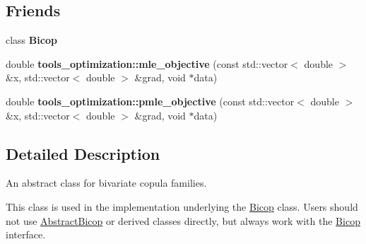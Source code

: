 \subsection*{Friends}
\begin{DoxyCompactItemize}
\item 
\hypertarget{classvinecopulib_1_1_abstract_bicop_af3db9e73153fd7fa7bb69657e7cb949d}{class {\bfseries Bicop}}\label{classvinecopulib_1_1_abstract_bicop_af3db9e73153fd7fa7bb69657e7cb949d}

\item 
\hypertarget{classvinecopulib_1_1_abstract_bicop_ac0e8ae7fffff069ed9476a97d8bfac19}{double {\bfseries tools\+\_\+optimization\+::mle\+\_\+objective} (const std\+::vector$<$ double $>$ \&x, std\+::vector$<$ double $>$ \&grad, void $\ast$data)}\label{classvinecopulib_1_1_abstract_bicop_ac0e8ae7fffff069ed9476a97d8bfac19}

\item 
\hypertarget{classvinecopulib_1_1_abstract_bicop_ae671e9f66df15a190329d53c802f70ef}{double {\bfseries tools\+\_\+optimization\+::pmle\+\_\+objective} (const std\+::vector$<$ double $>$ \&x, std\+::vector$<$ double $>$ \&grad, void $\ast$data)}\label{classvinecopulib_1_1_abstract_bicop_ae671e9f66df15a190329d53c802f70ef}

\end{DoxyCompactItemize}


\subsection{Detailed Description}
An abstract class for bivariate copula families. 

This class is used in the implementation underlying the \hyperlink{classvinecopulib_1_1_bicop}{Bicop} class. Users should not use \hyperlink{classvinecopulib_1_1_abstract_bicop}{Abstract\+Bicop} or derived classes directly, but always work with the \hyperlink{classvinecopulib_1_1_bicop}{Bicop} interface. 

